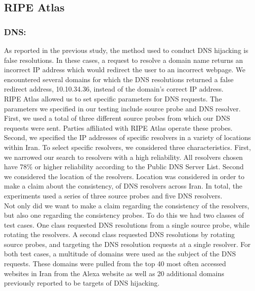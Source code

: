 \subsection{RIPE Atlas }

\subsubsection{DNS:} As reported in the previous study, the method used to conduct DNS hijacking is false resolutions. In these cases, a request to resolve a domain name returns an incorrect IP address which would redirect the user to an incorrect webpage. We encountered several domains for which the DNS resolutions returned a false redirect address, 10.10.34.36, instead of the domain’s correct IP address.  \\

        RIPE Atlas allowed us to set specific parameters for DNS requests. The parameters we specified in our testing include source probe and DNS resolver. First, we used a total of three different source probes from which our DNS requests were sent. Parties affiliated with RIPE Atlas operate these probes. Second, we specified the IP addresses of specific resolvers in a variety of locations within Iran. To select specific resolvers, we considered three characteristics. First, we narrowed our search to resolvers with a high reliability. All resolvers chosen have 78\% or higher reliability according to the Public DNS Server List. Second we considered the location of the resolvers. Location was considered in order to make a claim about the consistency, of DNS resolvers across Iran. In total, the experiments used a series of three source probes and five DNS resolvers. \\

        Not only did we want to make a claim regarding the consistency of the resolvers, but also one regarding the consistency probes. To do this we had two classes of test cases. One class requested DNS resolutions from a single source probe, while rotating the resolvers. A second class requested DNS resolutions by rotating source probes, and targeting the DNS resolution requests at a single resolver. For both test cases, a multitude of domains were used as the subject of the DNS requests. These domains were pulled from the top 40 most often accessed websites in Iran from the Alexa website as well as 20 additional domains previously reported to be targets of DNS hijacking. \\

